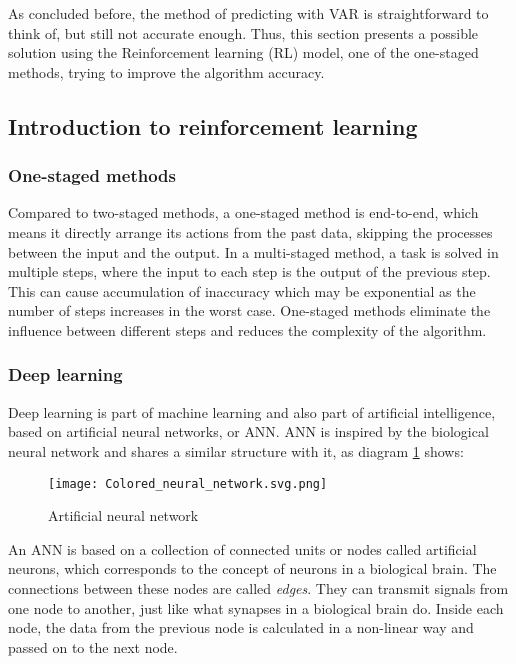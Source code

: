 \documentclass{mcmthesis}
\begin{document}
As concluded before,
the method of predicting with VAR is straightforward to think of,
but still not accurate enough.
Thus, this section presents a possible solution using the Reinforcement learning (RL) model, one of the one-staged methods,
trying to improve the algorithm accuracy.

\subsection{Introduction to reinforcement learning}

\subsubsection{One-staged methods}

Compared to two-staged methods, a one-staged method is end-to-end, which means it directly arrange its actions from the past data, skipping the processes between the input and the output\cite{lecun2004autonomous}.
In a multi-staged method, a task is solved in multiple steps, where the input to each step is the output of the previous step.
This can cause accumulation of inaccuracy which may be exponential as the number of steps increases in the worst case.
One-staged methods eliminate the influence between different steps and reduces the complexity of the algorithm.

\subsubsection{Deep learning}

Deep learning is part of machine learning and also part of artificial intelligence,
based on artificial neural networks, or ANN.
ANN is inspired by the biological neural network
and shares a similar structure with it, as diagram \ref{ANN} shows:

\begin{figure}[h]
\small
\centering
\texttt{[image: Colored\_neural\_network.svg.png]}
\caption{Artificial neural network} \label{ANN}
\end{figure}

An ANN is based on a collection of connected units or nodes called artificial neurons,
which corresponds to the concept of neurons in a biological brain.
The connections between these nodes are called \textit{edges}.
They can transmit signals from one node to another,
just like what synapses in a biological brain do.
Inside each node, the data from the previous node is calculated in a non-linear way
and passed on to the next node.
\end{document}
